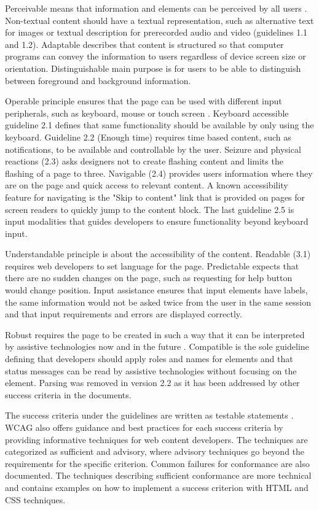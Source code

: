 

Perceivable means that information and elements can be perceived by all users \citep{wcag22}. Non-textual content should have a textual representation, such as alternative text for images or textual description for prerecorded audio and video (guidelines 1.1 and 1.2). Adaptable describes that content is structured so that computer programs can convey the information to users regardless of device screen size or orientation. Distinguishable main purpose is for users to be able to distinguish between foreground and background information.

Operable principle ensures that the page can be used with different input peripherals, such as keyboard, mouse or touch screen \citep{wcag22}. Keyboard accessible guideline 2.1 defines that same functionality should be available by only using the keyboard. Guideline 2.2 (Enough time) requires time based content, such as notifications, to be available and controllable by the user. Seizure and physical reactions (2.3) asks designers not to create flashing content and limits the flashing of a page to three. Navigable (2.4) provides users information where they are on the page and quick access to relevant content. A known accessibility feature for navigating is the "Skip to content" link that is provided on pages for screen readers to quickly jump to the content block. The last guideline 2.5 is input modalities that guides developers to ensure functionality beyond keyboard input.

Understandable principle is about the accessibility of the content. Readable (3.1) requires web developers to set language for the page. Predictable expects that there are no sudden changes on the page, such as requesting for help button would change position. Input assistance ensures that input elements have labels, the same information would not be asked twice from the user in the same session and that input requirements and errors are displayed correctly. 

Robust requires the page to be created in such a way that it can be interpreted by assistive technologies now and in the future \citep{wcag22}. Compatible is the sole guideline defining that developers should apply roles and names for elements and that status messages can be read by assistive technologies without focusing on the element. Parsing was removed in version 2.2 as it has been addressed by other success criteria in the documents.

The success criteria under the guidelines are written as testable statements \citep{wcag22}. WCAG also offers guidance and best practices for each success criteria by providing informative techniques for web content developers. The techniques are categorized as sufficient and advisory, where advisory techniques go beyond the requirements for the specific criterion. Common failures for conformance are also documented. The techniques describing sufficient conformance are more technical and contains examples on how to implement a success criterion with HTML and CSS techniques. 

